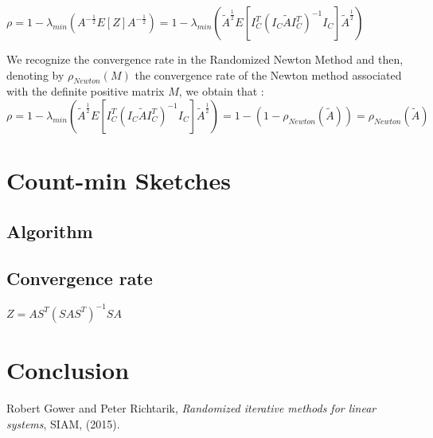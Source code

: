 $\rho = 1 - \lambda_{min}(A^{-\frac12}E[Z]A^{-\frac12}) = 1 - \lambda_{min}(\tilde{A}^{\frac 12} E[ I_{C}^{T} (I_{C} \tilde{A} I_{C}^{T})^{-1} I_{C} ] \tilde{A}^{\frac 12} ) $



We recognize the convergence rate in the Randomized Newton Method and then, denoting by $\rho_{Newton}(M)$ the convergence rate of the Newton method associated with the definite positive matrix $M$, we obtain that :\\
$\rho = 1 - \lambda_{min}( \tilde{A}^{\frac 12} E[ I_{C}^{T} (I_{C} \tilde{A} I_{C}^{T})^{-1} I_{C} ] \tilde{A}^{\frac 12}) = 1 -  (1 - \rho_{Newton}(\tilde{A} ) ) =  \rho_{Newton}(\tilde{A} ) $


\chapter{Count-min Sketches}

%
%
%

\section{Algorithm}


\section{Convergence rate}

$Z = A S^{T} (S A S^{T})^{-1} S A$\\


\chapter{Conclusion}

\appendix
\begin{thebibliography}{1}

\bibitem{}
{\sc Robert Gower and Peter Richtarik}, {\em Randomized iterative methods for linear systems}, SIAM, 
  (2015).



\end{thebibliography}






